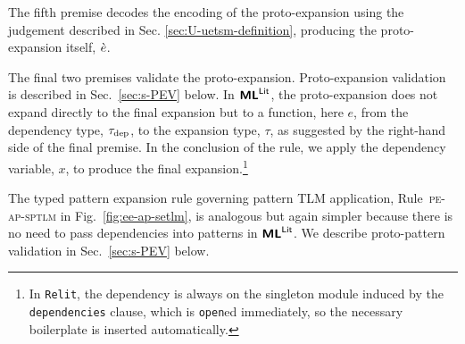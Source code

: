 \documentclass[acmsmall,screen]{acmart}
\newcommand{\lifootnote}[1]{\lstinline[basicstyle=\ttfamily\fontsize{7pt}{1em}\selectfont]{#1}}
\begin{document}
The fifth premise decodes the encoding of the proto-expansion using the judgement described in Sec. \ref{sec:U-uetsm-definition}, producing the proto-expansion itself, $\grave{e}$. 

The final two premises validate the proto-expansion. Proto-expansion validation is described in Sec.~\ref{sec:s-PEV} below. In $\textsf{\textbf{ML}}^\textsf{Lit}$, the proto-expansion does not expand directly to the final expansion but to a function, here $e$, from the dependency type, $\tau_\text{dep}$, to the expansion type, $\tau$, as suggested by the right-hand side of the final premise. In the conclusion of the rule, we apply the dependency variable, $x$, to produce the final expansion.\footnote{In \lifootnote{Relit}, the dependency is always on the singleton module induced by the \lifootnote{dependencies} clause, which is \lifootnote{open}ed immediately, so the necessary boilerplate is inserted automatically.%
}

The typed pattern expansion rule governing pattern TLM application, Rule~\textsc{pe-ap-sptlm} in Fig.~\ref{fig:ee-ap-setlm}, is analogous but again simpler because there is no need to pass dependencies into patterns in $\textsf{\textbf{ML}}^\textsf{Lit}$.
We describe proto-pattern validation in Sec.~\ref{sec:s-PEV} below.
\end{document}
